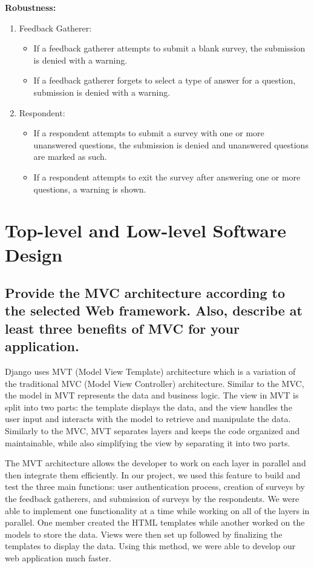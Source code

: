 \documentclass[letterpaper, 12 pt, conference]{ieeeconf}
\begin{document}
\textbf{Robustness:}
\begin{enumerate}
    \item[] Feedback Gatherer:
    \begin{itemize}
        \item  If a feedback gatherer attempts to submit a blank survey, the submission is denied with a warning.
        \item If a feedback gatherer forgets to select a type of answer for a question, submission is denied with a warning.
    \end{itemize}
    \item[] Respondent:
    \begin{itemize}
        \item If a respondent attempts to submit a survey with one or more unanswered questions, the submission is denied and unanswered questions are marked as such.
        \item If a respondent attempts to exit the survey after answering one or more questions, a warning is shown.
    \end{itemize}
\end{enumerate}

\newpage 
\section{Top-level and Low-level Software Design}
\subsection{Provide the MVC architecture according to the selected Web framework. Also, describe at least three benefits of MVC for your application.}
\newline
\hfill

Django uses MVT (Model View Template) architecture which is a variation of the traditional MVC (Model View Controller) architecture. Similar to the MVC, the model in MVT represents the data and business logic. The view in MVT is split into two parts: the template displays the data, and the view handles the user input and interacts with the model to retrieve and manipulate the data. Similarly to the MVC, MVT separates layers and keeps the code organized and maintainable, while also simplifying the view by separating it into two parts. 
\newline

The MVT architecture allows the developer to work on each layer in parallel and then integrate them efficiently. In our project, we used this feature to build and test the three main functions: user authentication process, creation of surveys by the feedback gatherers, and submission of surveys by the respondents. We were able to implement one functionality at a time while working on all of the layers in parallel. One member created the HTML templates while another worked on the models to store the data. Views were then set up followed by finalizing the templates to display the data. Using this method, we were able to develop our web application much faster.
\newline
\end{document}
